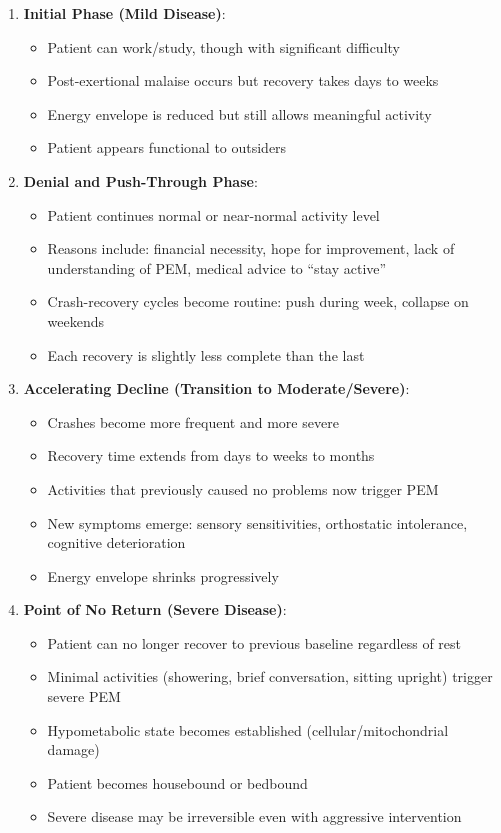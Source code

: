 \begin{enumerate}
    \item \textbf{Initial Phase (Mild Disease)}:
    \begin{itemize}
        \item Patient can work/study, though with significant difficulty
        \item Post-exertional malaise occurs but recovery takes days to weeks
        \item Energy envelope is reduced but still allows meaningful activity
        \item Patient appears functional to outsiders
    \end{itemize}

    \item \textbf{Denial and Push-Through Phase}:
    \begin{itemize}
        \item Patient continues normal or near-normal activity level
        \item Reasons include: financial necessity, hope for improvement, lack of understanding of PEM, medical advice to ``stay active''
        \item Crash-recovery cycles become routine: push during week, collapse on weekends
        \item Each recovery is slightly less complete than the last
    \end{itemize}

    \item \textbf{Accelerating Decline (Transition to Moderate/Severe)}:
    \begin{itemize}
        \item Crashes become more frequent and more severe
        \item Recovery time extends from days to weeks to months
        \item Activities that previously caused no problems now trigger PEM
        \item New symptoms emerge: sensory sensitivities, orthostatic intolerance, cognitive deterioration
        \item Energy envelope shrinks progressively
    \end{itemize}

    \item \textbf{Point of No Return (Severe Disease)}:
    \begin{itemize}
        \item Patient can no longer recover to previous baseline regardless of rest
        \item Minimal activities (showering, brief conversation, sitting upright) trigger severe PEM
        \item Hypometabolic state becomes established (cellular/mitochondrial damage)
        \item Patient becomes housebound or bedbound
        \item Severe disease may be irreversible even with aggressive intervention
    \end{itemize}
\end{enumerate}

